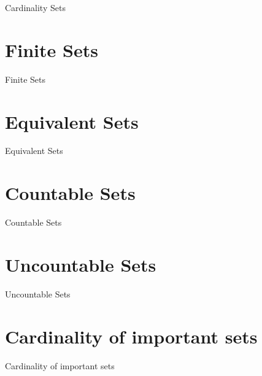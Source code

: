 Cardinality Sets

\section{Finite Sets}
\label{sec:finite-sets}

Finite Sets

\section{Equivalent Sets}
\label{sec:equivalent-sets}

Equivalent Sets

\section{Countable Sets}
\label{sec:countable-sets}

Countable Sets

\section{Uncountable Sets}
\label{sec:uncountable-sets}

Uncountable Sets

\section{Cardinality of important sets}
\label{sec:cardinality-of-important-sets}

Cardinality of important sets
